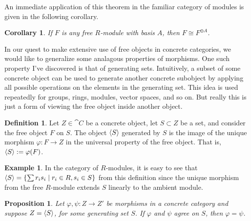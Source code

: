 \documentclass[12pt]{article}
\theoremstyle{definition}
\newtheorem{definition}{Definition}[section]
\newtheorem{example}{Example}[section]
\theoremstyle{plain}
\newtheorem{proposition}[theorem] {Proposition}
\newtheorem*{corollary*}{Corollary}
\numberwithin{equation}{section}
\theoremstyle{definition}
\begin{document}
An immediate application of this theorem in the familiar category of modules is given in the following corollary.

\begin{corollary*}
If $ F $ is any free $ R $-module with basis $ A $, then $ F \cong F^{\oplus A} $.
\end{corollary*}

In our quest to make extensive use of free objects in concrete categories, we would like to generalize some analagous properties of morphisms. One such property I've discovered is that of generating sets. Intuitively, a subset of some concrete object can be used to generate another concrete subobject by applying all possible operations on the elements in the generating set. This idea is used repeatedly for groups, rings, modules, vector spaces, and so on. But really this is just a form of viewing the free object inside another object.

\begin{definition} \label{def_concrete_gen}
Let $ Z \in \cat{C}$ be a concrete object, let $ S \subset Z$ be a set, and consider the free object $ F $ on $ S $. The object $ \langle S \rangle $ generated by $ S $ is the image of the unique morphism $ \varphi : F \to Z $ in the universal property of the free object. That is, $ \langle S \rangle := \varphi (F) $.
\end{definition}

\begin{example}
In the category of $ R $-modules, it is easy to see that $ \langle S \rangle = \{ \sum r_i s_i \mid r_i \in R, s_i \in S\} $ from this definition since the unique morphism from the free $ R $-module extends $ S $ linearly to the ambient module.
\end{example}

\begin{proposition} \label{concrete_gen}
Let $ \varphi, \psi : Z \to Z'  $ be morphisms in a concrete category and suppose $ Z = \langle S \rangle $, for some generating set $ S $. If $ \varphi  $ and $ \psi $ agree on $ S $, then $ \varphi = \psi $.
\end{proposition}
\end{document}

